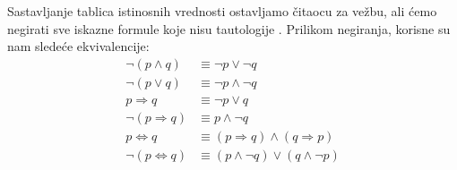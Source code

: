 Sastavljanje tablica istinosnih vrednosti ostavljamo \v citaocu za ve\v zbu, ali \' cemo negirati sve iskazne formule koje nisu tautologije%
. Prilikom negiranja, korisne su nam slede\' ce ekvivalencije:
\begin{align*}
\neg(p\wedge q)&\equiv \neg p\vee\neg q\\
\neg(p\vee q)&\equiv \neg p\wedge \neg q\\
p\Rightarrow q &\equiv \neg p\vee q\\
\neg(p\Rightarrow q)&\equiv p\wedge \neg q\\
p\Leftrightarrow q&\equiv (p\Rightarrow q)\wedge(q\Rightarrow p)\\
\neg(p\Leftrightarrow q)&\equiv (p\wedge \neg q)\vee(q\wedge \neg p)
\end{align*}
